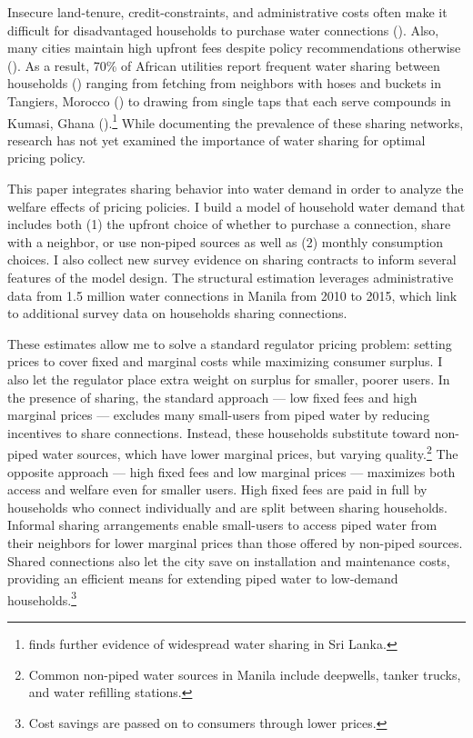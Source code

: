 \documentclass[12pt]{article}
\begin{document}

Insecure land-tenure, credit-constraints, and administrative costs often make it difficult for disadvantaged households to purchase water connections (\cite{devoto2012happiness}).  Also, many cities maintain high upfront fees despite policy recommendations otherwise (\cite{hoque2013state}).  As a result, 70\% of African utilities report frequent water sharing between households (\cite{keener2010provision}) ranging from fetching from neighbors with hoses and buckets in Tangiers, Morocco (\cite{devoto2012happiness}) to drawing from single taps that each serve compounds in Kumasi, Ghana (\cite{whittington1992possible}).\footnote{\cite{nauges2006water} finds further evidence of widespread water sharing in Sri Lanka.}  While documenting the prevalence of these  sharing networks, research has not yet examined the importance of water sharing for optimal pricing policy.  

This paper integrates sharing behavior into water demand in order to analyze the welfare effects of pricing policies.  I build a model of household water demand that includes both (1) the upfront choice of whether to purchase a connection, share with a neighbor, or use non-piped sources as well as (2) monthly consumption choices.  I also collect new survey evidence on sharing contracts to inform several features of the model design.  The structural estimation leverages administrative data from 1.5 million water connections in Manila from 2010 to 2015, which link to additional survey data on households sharing connections.  

These estimates allow me to solve a standard regulator pricing problem: setting prices to cover fixed and marginal costs while maximizing consumer surplus.  I also let the regulator place extra weight on surplus for smaller, poorer users.  In the presence of sharing, the standard approach --- low fixed fees and high marginal prices --- excludes many small-users from piped water by reducing incentives to share connections.  Instead, these households substitute toward non-piped water sources, which have lower marginal prices, but varying quality.\footnote{Common non-piped water sources in Manila include deepwells, tanker trucks, and water refilling stations.}  The opposite approach --- high fixed fees and low marginal prices --- maximizes both access and welfare even for smaller users.  High fixed fees are paid in full by households who connect individually and are split between sharing households.  Informal sharing arrangements enable small-users to access piped water from their neighbors for lower marginal prices than those offered by non-piped sources.  Shared connections also let the city save on installation and maintenance costs, providing an efficient means for extending piped water to low-demand households.\footnote{Cost savings are passed on to consumers through lower prices.}  
\end{document}
